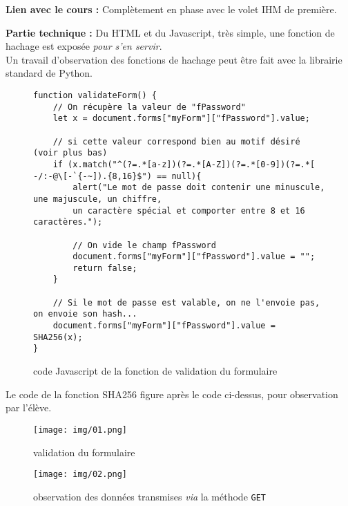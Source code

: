 \documentclass[12pt]{scrartcl}
\begin{document}
\textbf{Lien avec le cours : } Complètement en phase avec le volet IHM de première.

\textbf{Partie technique : } Du HTML et du Javascript, très simple, une fonction de hachage est exposée \textit{pour s'en servir}.\\

Un travail d'observation des fonctions de hachage peut être fait avec la librairie standard de Python.


\begin{figure}[H]
    \begin{verbatim}
function validateForm() {
    // On récupère la valeur de "fPassword"
    let x = document.forms["myForm"]["fPassword"].value; 

    // si cette valeur correspond bien au motif désiré (voir plus bas)
    if (x.match("^(?=.*[a-z])(?=.*[A-Z])(?=.*[0-9])(?=.*[ -/:-@\[-`{-~]).{8,16}$") == null){
        alert("Le mot de passe doit contenir une minuscule, une majuscule, un chiffre,
        un caractère spécial et comporter entre 8 et 16 caractères.");
        
        // On vide le champ fPassword
        document.forms["myForm"]["fPassword"].value = ""; 
        return false;
    }

    // Si le mot de passe est valable, on ne l'envoie pas, on envoie son hash...
    document.forms["myForm"]["fPassword"].value = SHA256(x); 
}
\end{verbatim}
    \caption{code Javascript de la fonction de validation du formulaire}
\end{figure}

Le code de la fonction SHA256 figure après le code ci-dessus, pour observation par l'élève.


\begin{figure}[H]
    \begin{center}
        \texttt{[image: img/01.png]}
    \end{center}
    \caption{validation du formulaire}
\end{figure}

\begin{figure}[H]
    \begin{center}
        \texttt{[image: img/02.png]}
    \end{center}
    \caption{observation des données transmises \textit{via} la méthode \texttt{GET}}
\end{figure}
\end{document}
